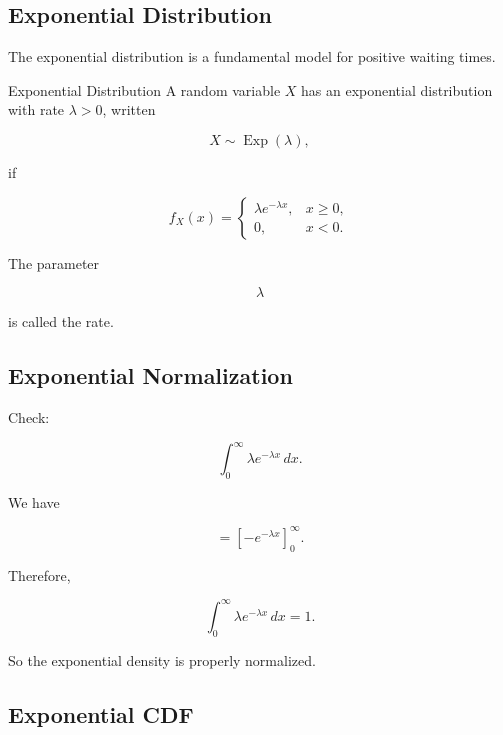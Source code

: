 \subsection{Exponential Distribution}
\label{subsec:exponential-distribution}

The exponential distribution is a fundamental model for positive
waiting times.

\begin{definitionbox}{Exponential Distribution}
A random variable \(X\) has an exponential distribution with rate
\(\lambda>0\), written

\[
\boxed{
X\sim\operatorname{Exp}(\lambda),
}
\]

if

\[
\boxed{
f_X(x)
=
\begin{cases}
\lambda e^{-\lambda x},&x\geq0,\\
0,&x<0.
\end{cases}
}
\]
\end{definitionbox}

The parameter

\[
\lambda
\]

is called the rate.

\subsection{Exponential Normalization}
\label{subsec:exponential-normalization}

Check:

\[
\int_0^\infty
\lambda e^{-\lambda x}\,dx.
\]

We have

\[
=
\left[
-e^{-\lambda x}
\right]_0^\infty.
\]

Therefore,

\[
\boxed{
\int_0^\infty
\lambda e^{-\lambda x}\,dx
=
1.
}
\]

So the exponential density is properly normalized.

\subsection{Exponential CDF}
\label{subsec:exponential-cdf}

